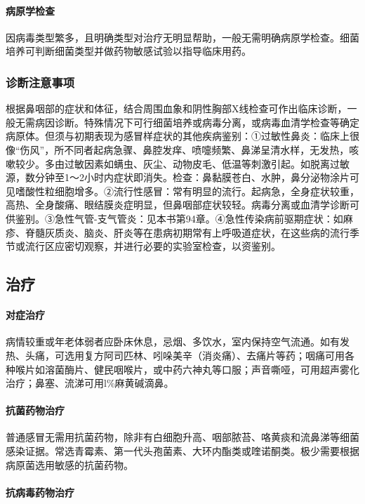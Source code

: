 \paragraph{病原学检查}

因病毒类型繁多，且明确类型对治疗无明显帮助，一般无需明确病原学检查。细菌培养可判断细菌类型并做药物敏感试验以指导临床用药。

\subsubsection{诊断注意事项}

根据鼻咽部的症状和体征，结合周围血象和阴性胸部X线检查可作出临床诊断，一般无需病因诊断。特殊情况下可行细菌培养或病毒分离，或病毒血清学检查等确定病原体。但须与初期表现为感冒样症状的其他疾病鉴别：①过敏性鼻炎：临床上很像“伤风”，所不同者起病急骤、鼻腔发痒、喷嚏频繁、鼻涕呈清水样，无发热，咳嗽较少。多由过敏因素如螨虫、灰尘、动物皮毛、低温等刺激引起。如脱离过敏源，数分钟至1～2小时内症状即消失。检查：鼻黏膜苍白、水肿，鼻分泌物涂片可见嗜酸性粒细胞增多。②流行性感冒：常有明显的流行。起病急，全身症状较重，高热、全身酸痛、眼结膜炎症明显，但鼻咽部症状较轻。病毒分离或血清学诊断可供鉴别。③急性气管-支气管炎：见本书第94章。④急性传染病前驱期症状：如麻疹、脊髓灰质炎、脑炎、肝炎等在患病初期常有上呼吸道症状，在这些病的流行季节或流行区应密切观察，并进行必要的实验室检查，以资鉴别。

\subsection{治疗}

\paragraph{对症治疗}

病情较重或年老体弱者应卧床休息，忌烟、多饮水，室内保持空气流通。如有发热、头痛，可选用复方阿司匹林、吲哚美辛（消炎痛）、去痛片等药；咽痛可用各种喉片如溶菌酶片、健民咽喉片，或中药六神丸等口服；声音嘶哑，可用超声雾化治疗；鼻塞、流涕可用l\%麻黄碱滴鼻。

\paragraph{抗菌药物治疗}

普通感冒无需用抗菌药物，除非有白细胞升高、咽部脓苔、咯黄痰和流鼻涕等细菌感染证据。常选青霉素、第一代头孢菌素、大环内酯类或喹诺酮类。极少需要根据病原菌选用敏感的抗菌药物。

\paragraph{抗病毒药物治疗}

